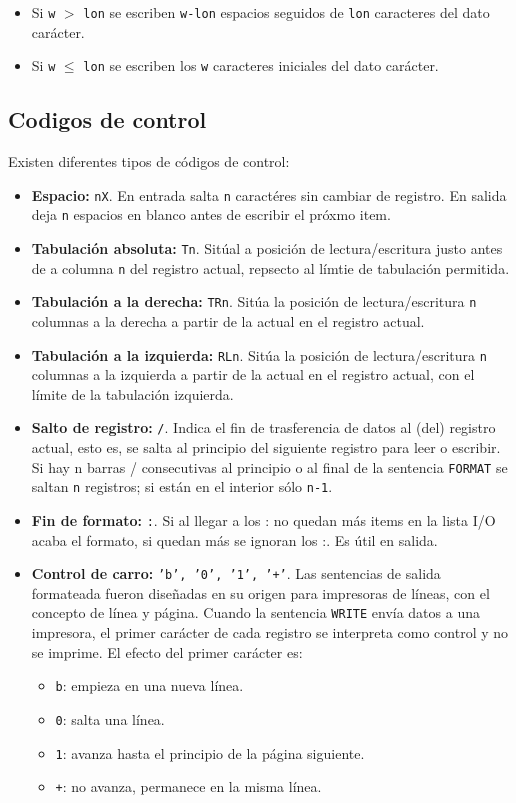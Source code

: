 \begin{itemize}
	\item Si {\tt w} $>$ {\tt lon} se escriben {\tt w-lon} espacios seguidos de {\tt lon} caracteres del dato carácter.
	\item Si {\tt w} $\leq$ {\tt lon} se escriben los {\tt w} caracteres iniciales del dato carácter.
\end{itemize}

\subsection{Codigos de control}

Existen diferentes tipos de códigos de control:

\begin{itemize}
	\item \textbf{Espacio:} {\tt nX}. En entrada salta {\tt n} caractéres sin cambiar de registro. En salida deja {\tt n} espacios en blanco antes de escribir el próxmo item.
	\item \textbf{Tabulación absoluta:} {\tt Tn}. Sitúal a posición de lectura/escritura justo antes de a columna {\tt n} del registro actual, repsecto al límtie de tabulación permitida.
	\item \textbf{Tabulación a la derecha:} {\tt TRn}. Sitúa la posición de lectura/escritura {\tt n} columnas a la derecha a partir de la actual en el registro actual.
	\item \textbf{Tabulación a la izquierda:} {\tt RLn}. Sitúa la posición de lectura/escritura {\tt n} columnas a la izquierda a partir de la actual en el registro actual, con el límite de la tabulación izquierda.
	\item \textbf{Salto de registro:} {\tt /}. Indica el fin de trasferencia de datos al (del) registro actual, esto es, se salta al principio del siguiente registro para leer o escribir. Si hay n barras / consecutivas al principio o al final de la sentencia {\tt FORMAT} se saltan {\tt n} registros; si están en el interior sólo {\tt n-1}.
	\item \textbf{Fin de formato:} {\tt :}. Si al llegar a los : no quedan más items en la lista I/O acaba el formato, si quedan más se ignoran los :. Es útil en salida.
	\item \textbf{Control de carro:} {\tt 'b', '0', '1', '+'}. Las sentencias de salida formateada fueron diseñadas en su origen para impresoras de líneas, con el concepto de línea y página. Cuando la sentencia {\tt WRITE} envía datos a una impresora, el primer carácter de cada registro se interpreta como control y no se imprime. El efecto del primer carácter es:
	
	\begin{itemize}
		\item {\tt b}: empieza en una nueva línea.
		\item {\tt 0}: salta una línea.
		\item {\tt 1}: avanza hasta el principio de la página siguiente.
		\item {\tt +}: no avanza, permanece en la misma línea.
	\end{itemize}
\end{itemize}
